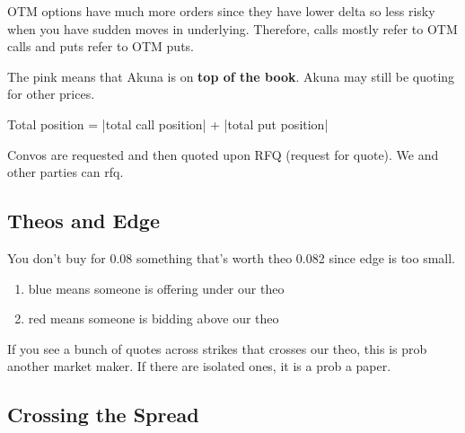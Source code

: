 \documentclass{article}
\begin{document}
    OTM options have much more orders since they have lower delta so less risky when you have sudden moves in underlying. Therefore, calls mostly refer to OTM calls and puts refer to OTM puts. 

    The pink means that Akuna is on \textbf{top of the book}. Akuna may still be quoting for other prices.

    Total position = |total call position| + |total put position|

    Convos are requested and then quoted upon RFQ (request for quote). We and other parties can rfq. 

  \subsection{Theos and Edge}

    You don't buy for 0.08 something that's worth theo 0.082 since edge is too small. 
    \begin{enumerate}
      \item blue means someone is offering under our theo
      \item red means someone is bidding above our theo
    \end{enumerate}
    If you see a bunch of quotes across strikes that crosses our theo, this is prob another market maker. If there are isolated ones, it is a prob a paper.   

  \subsection{Crossing the Spread}
\end{document}

